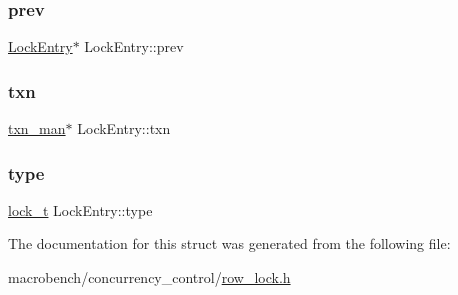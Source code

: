 \subsubsection{\texorpdfstring{prev}{prev}}
{\footnotesize\ttfamily \hyperlink{structLockEntry}{Lock\+Entry}$\ast$ Lock\+Entry\+::prev}

\mbox{\label{structLockEntry_a8ede0c291a86aaa49a20dafa4b05fe71}} 
\subsubsection{\texorpdfstring{txn}{txn}}
{\footnotesize\ttfamily \hyperlink{classtxn__man}{txn\+\_\+man}$\ast$ Lock\+Entry\+::txn}

\mbox{\label{structLockEntry_a826fc7a355c259f24961b83684a51009}} 
\subsubsection{\texorpdfstring{type}{type}}
{\footnotesize\ttfamily \hyperlink{global_8h_a1da8554b34c21f74268d962b6559b0a6}{lock\+\_\+t} Lock\+Entry\+::type}



The documentation for this struct was generated from the following file\+:\begin{DoxyCompactItemize}
\item 
macrobench/concurrency\+\_\+control/\hyperlink{row__lock_8h}{row\+\_\+lock.\+h}\end{DoxyCompactItemize}
